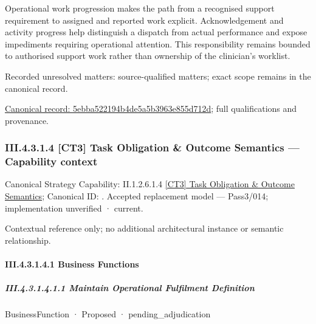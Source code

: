 Operational work progression makes the path from a recognised support requirement to assigned and reported work explicit. Acknowledgement and activity progress help distinguish a dispatch from actual performance and expose impediments requiring operational attention. This responsibility remains bounded to authorised support work rather than ownership of the clinician's worklist.


{\small Recorded unresolved matters: source-qualified matters; exact scope remains in the canonical record.}\par
{\footnotesize \href{../../../../../../../continuum/business/business-process/5ebba522194b4de5a5b3963e855d712d.md}{Canonical record: 5ebba522194b4de5a5b3963e855d712d}; full qualifications and provenance.}\par
\subsubsection*{III.4.3.1.4 [CT3] Task Obligation \& Outcome Semantics — Capability context}
\label{navigation:III.4.3.1.4}

{\small Canonical Strategy Capability: II.1.2.6.1.4 \hyperref[element:aa301a98cf30454889f1eec8f0a742ab]{[CT3] Task Obligation \& Outcome Semantics}; Canonical ID: \texttt{}. Accepted replacement model — Pass3/014; implementation unverified · current.}\par
Contextual reference only; no additional architectural instance or semantic relationship.\par
\paragraph*{III.4.3.1.4.1 Business Functions}
\label{navigation:III.4.3.1.4.1}

\subparagraph*{III.4.3.1.4.1.1 Maintain Operational Fulfilment Definition}
\label{navigation:III.4.3.1.4.1.1}

\label{element:9f7085926221436bb672e52e59bca512}
{\small BusinessFunction · Proposed · pending\_adjudication}\par

